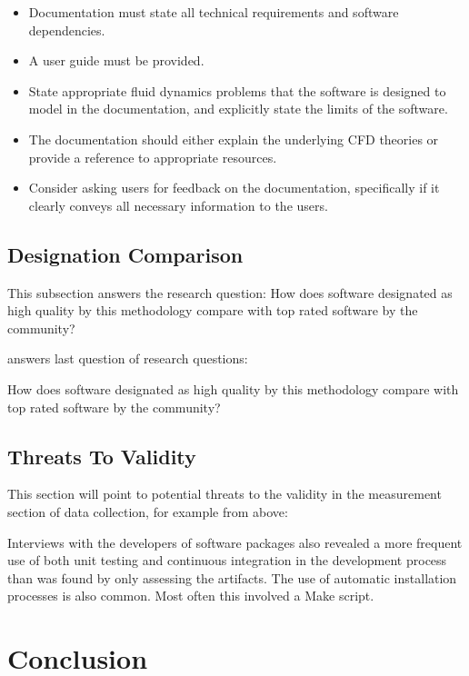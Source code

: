 \documentclass[12pt, notitlepage]{article}
\begin{document}
\begin{itemize}
	\item Documentation must state all technical requirements and software dependencies. 
	\item A user guide must be provided.
	\item State appropriate fluid dynamics problems that the software is designed to model in the documentation, and explicitly state the limits of the software. 
	\item The documentation should either explain the underlying CFD theories or provide a reference to appropriate resources.
	\item Consider asking users for feedback on the documentation, specifically if it clearly conveys all necessary information to the users.
\end{itemize}


\subsection{Designation Comparison}\label{comparison}

This subsection answers the research question: How does software designated as high quality by this methodology compare with top rated software by the community?


answers last question of research questions:

How does software designated as high quality by this methodology compare	with top rated software by the community?


\subsection{Threats To Validity}\label{threats}

This section will point to potential threats to the validity in the measurement section of data collection, for example from above:

Interviews with the developers of software packages also revealed a more frequent use of both unit testing and continuous integration in the development process than was found by only assessing the artifacts. The use of automatic installation processes is also common. Most often this involved a Make script.


\newpage
\section{Conclusion}
\end{document}

